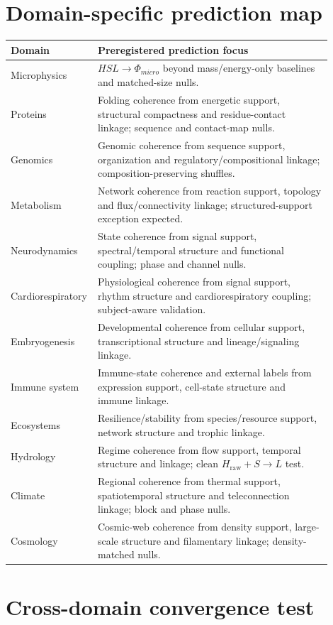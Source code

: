 \documentclass[11pt,a4paper]{article}
\newcommand{\Hraw}{H_{\mathrm{raw}}}
\begin{document}
\section{Domain-specific prediction map}

\begin{longtable}{p{0.18\linewidth}p{0.72\linewidth}}
\toprule
\textbf{Domain} & \textbf{Preregistered prediction focus}\\
\midrule
Microphysics & $HSL\rightarrow\Phi_{micro}$ beyond mass/energy-only baselines and matched-size nulls.\\
Proteins & Folding coherence from energetic support, structural compactness and residue-contact linkage; sequence and contact-map nulls.\\
Genomics & Genomic coherence from sequence support, organization and regulatory/compositional linkage; composition-preserving shuffles.\\
Metabolism & Network coherence from reaction support, topology and flux/connectivity linkage; structured-support exception expected.\\
Neurodynamics & State coherence from signal support, spectral/temporal structure and functional coupling; phase and channel nulls.\\
Cardiorespiratory & Physiological coherence from signal support, rhythm structure and cardiorespiratory coupling; subject-aware validation.\\
Embryogenesis & Developmental coherence from cellular support, transcriptional structure and lineage/signaling linkage.\\
Immune system & Immune-state coherence and external labels from expression support, cell-state structure and immune linkage.\\
Ecosystems & Resilience/stability from species/resource support, network structure and trophic linkage.\\
Hydrology & Regime coherence from flow support, temporal structure and linkage; clean $\Hraw+S\rightarrow L$ test.\\
Climate & Regional coherence from thermal support, spatiotemporal structure and teleconnection linkage; block and phase nulls.\\
Cosmology & Cosmic-web coherence from density support, large-scale structure and filamentary linkage; density-matched nulls.\\
\bottomrule
\end{longtable}

\section{Cross-domain convergence test}
\end{document}
